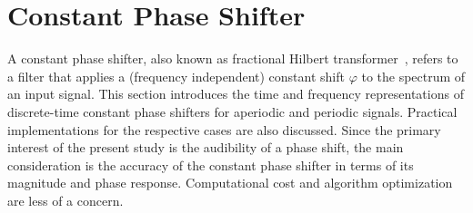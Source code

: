 \section{Constant Phase Shifter}
\label{sec:constant-phase-shifter}
%
A constant phase shifter, also known as fractional Hilbert transformer~\cite{lohmann1996},
refers to a filter that applies a (frequency independent) constant shift $\varphi$
to the spectrum of an input signal.
This section introduces the time and frequency representations
of discrete-time constant phase shifters for aperiodic and periodic signals.
Practical implementations for the respective cases are also discussed.
Since the primary interest of the present study is the audibility of a phase shift,
the main consideration is the accuracy of the constant phase shifter
in terms of its magnitude and phase response.
Computational cost and algorithm optimization are less of a concern.

